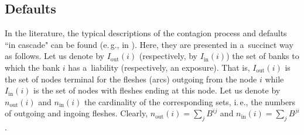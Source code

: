 \begin{multicols}{2}
\subsection{Defaults}

\noindent
In the literature, the typical descriptions of the contagion process and 
defaults ``in cascade" can be found (e.\,g., in  \cite{Hurd}). Here, they are 
presented in a~succinct  
way  as follows.  Let us denote by $I_{\mathrm{out}}(i)$ (respectively, by $I_{\mathrm{in}}(i)$) 
the set  of banks to which the bank $i$
has a~liability (respectively, an exposure). That is,  $I_{\mathrm{out}}(i)$ is the set 
of  nodes terminal for the fleshes (arcs) outgoing from the node $i$ while 
$I_{\mathrm{in}}(i)$ is the set of nodes with fleshes ending at this node. Let us 
denote by 
$n_{\mathrm{out}}(i)$ and $n_{\mathrm{in}}(i)$ 
the cardinality of the corresponding sets, i.\,e., the 
numbers  of outgoing  and ingoing fleshes.  Clearly,  $n_{\mathrm{out}}(i)=\sum\nolimits_jB^{ij}$ 
and $n_{\mathrm{in}}(i)=\sum\nolimits_jB^{ji}$. 


\end{multicols}
